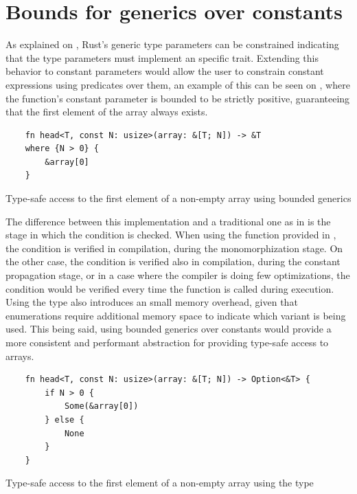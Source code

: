 \section{Bounds for generics over constants}

As explained on , Rust's generic type parameters can be
constrained indicating that the type parameters must implement an specific
trait. Extending this behavior to constant parameters would allow the user to
constrain constant expressions using predicates over them, an example of this
can be seen on , where the 
function's constant parameter  is bounded to be strictly positive,
guaranteeing that the first element of the array always exists. 

\begin{listing}[h]
	\begin{verbatim}
    fn head<T, const N: usize>(array: &[T; N]) -> &T
    where {N > 0} {
        &array[0]
    }
    \end{verbatim}
    \caption{Type-safe access to the first element of a non-empty array using bounded generics}
  \label{lst:head_const_generics}
\end{listing}

The difference between this implementation and a traditional one as in
 is the stage in which the condition  is
checked. When using the function provided in ,
the condition is verified in compilation, during the monomorphization stage. On
the other case, the condition is verified also in compilation, during the
constant propagation stage, or in a case where the compiler is doing few
optimizations, the condition would be verified every time the function is
called during execution. Using the  type also introduces an
small memory overhead, given that enumerations require additional memory space
to indicate which variant is being used. This being said, using bounded
generics over constants would provide a more consistent and performant
abstraction for providing type-safe access to arrays.

\begin{listing}[h]
	\begin{verbatim}
    fn head<T, const N: usize>(array: &[T; N]) -> Option<&T> {
        if N > 0 {
            Some(&array[0])
        } else {
            None
        }
    }
    \end{verbatim}
    \caption{Type-safe access to the first element of a non-empty array using the  type}
  \label{lst:head_no_bounds}
\end{listing}

